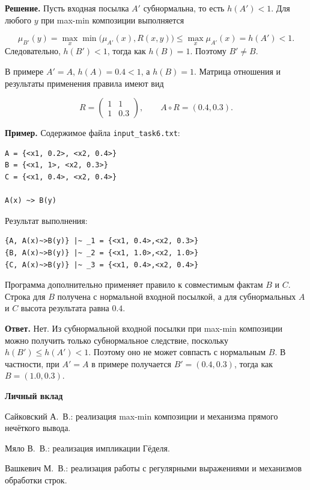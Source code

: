 \documentclass[14pt,a4paper]{extarticle}
\newcommand{\studentone}{Сайковский А.~В.}
\newcommand{\studenttwo}{Мяло В.~В.}
\newcommand{\studentthree}{Вашкевич М.~В.}
\newcommand{\reportheading}[1]{\par\vspace{0.8\baselineskip}\noindent\textbf{#1}\par\nobreak\vspace{0.35\baselineskip}\nobreak}
\begin{document}
\smallskip\noindent\textbf{Решение.} Пусть входная посылка $A'$ субнормальна, то есть $h(A')<1$. Для любого $y$ при max-min композиции выполняется

\[
\mu_{B'}(y)=\max_x\min\bigl(\mu_{A'}(x),R(x,y)\bigr)
\leq\max_x\mu_{A'}(x)=h(A')<1.
\]
Следовательно, $h(B')<1$, тогда как $h(B)=1$. Поэтому $B'\ne B$.

В примере $A'=A$, $h(A)=0.4<1$, а $h(B)=1$. Матрица отношения и результаты применения правила имеют вид

\[
R=\begin{pmatrix}1&1\\1&0.3\end{pmatrix},\qquad A\circ R=(0.4,0.3).
\]

\noindent\textbf{Пример.} Содержимое файла \texttt{input\_task6.txt}:

\begin{Verbatim}[fontsize=\small,baselinestretch=1,frame=single,breaklines=true]
A = {<x1, 0.2>, <x2, 0.4>}
B = {<x1, 1>, <x2, 0.3>}
C = {<x1, 0.4>, <x2, 0.4>}

A(x) ~> B(y)
\end{Verbatim}

\noindent Результат выполнения:

\begin{Verbatim}[fontsize=\small,baselinestretch=1,frame=single,breaklines=true]
{A, A(x)~>B(y)} |~ _1 = {<x1, 0.4>,<x2, 0.3>}
{B, A(x)~>B(y)} |~ _2 = {<x1, 1.0>,<x2, 1.0>}
{C, A(x)~>B(y)} |~ _3 = {<x1, 0.4>,<x2, 0.4>}
\end{Verbatim}

Программа дополнительно применяет правило к совместимым фактам $B$ и $C$. Строка для $B$ получена с нормальной входной посылкой, а для субнормальных $A$ и $C$ высота результата равна $0.4$.

\smallskip\noindent\textbf{Ответ.} Нет. Из субнормальной входной посылки при max-min композиции можно получить только субнормальное следствие, поскольку $h(B')\leq h(A')<1$. Поэтому оно не может совпасть с нормальным $B$. В частности, при $A'=A$ в примере получается $B'=(0.4,0.3)$, тогда как $B=(1.0,0.3)$.

\clearpage
\reportheading{Личный вклад}
\studentone: реализация max-min композиции и механизма прямого нечёткого вывода.

\studenttwo: реализация импликации Гёделя.

\studentthree: реализация работы с регулярными выражениями и механизмов обработки строк.
\end{document}
